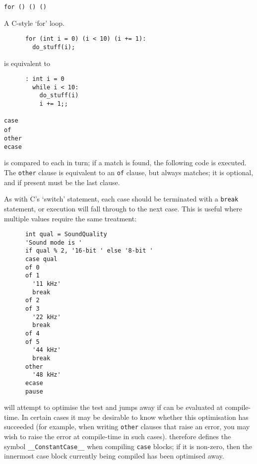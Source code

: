     \noindent\lstinline|for (|\lstinline|) (|\lstinline|) (|\lstinline|)|~
    \begin{cmdesc}
      A C-style `for' loop.

      \begin{lstlisting}
      for (int i = 0) (i < 10) (i += 1):
        do_stuff(i);
      \end{lstlisting}
      \noindent
      is equivalent to
      \begin{lstlisting}
      : int i = 0
        while i < 10:
          do_stuff(i)
          i += 1;;
      \end{lstlisting}
    \end{cmdesc}

    \noindent\lstinline|case|~\\
    \lstinline|of|~\\
    \lstinline|other|\\
    \lstinline|ecase|
    \begin{cmdesc}
       is compared to each  in turn; if a match is 
      found, the following code is executed.  The \lstinline|other| clause is 
      equivalent to an \lstinline|of| clause, but always matches; it is 
      optional, and if present must be the last clause.

      As with C's `switch' statement, each case should be terminated with a
      \lstinline|break| statement, or execution will fall through to the next
      case.  This is useful where multiple values require the same treatment:

      \begin{lstlisting}
      int qual = SoundQuality
      'Sound mode is '
      if qual % 2, '16-bit ' else '8-bit '
      case qual
      of 0
      of 1
        '11 kHz'
        break
      of 2
      of 3
        '22 kHz'
        break
      of 4
      of 5
        '44 kHz'
        break
      other
        '48 kHz'
      ecase
      pause
      \end{lstlisting}
      
      \compiler{} will attempt to optimise the test and jumps away if 
       can be evaluated at compile-time.  In certain cases it may 
      be desirable to know whether this optimisation has succeeded (for example, 
      when writing \lstinline|other| clauses that raise an error, you may wish 
      to raise the error at compile-time in such cases).  \compiler{} therefore 
      defines the symbol \lstinline|__ConstantCase__| when compiling 
      \lstinline|case| blocks; if it is non-zero, then the innermost case block 
      currently being compiled has been optimised away.      
    \end{cmdesc}

